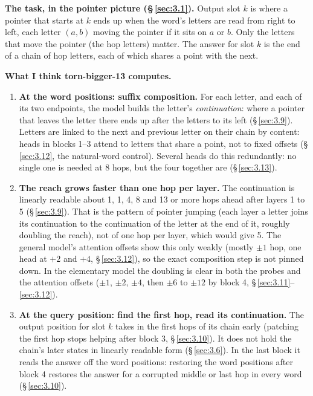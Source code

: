 \documentclass[paper=a4,fontsize=11pt,DIV=11,parskip=half,headings=small,numbers=noendperiod]{scrartcl}
\DeclareRobustCommand{\lead}[1]{\textsf{\bfseries\color{accent}#1}}
\DeclareRobustCommand{\code}[1]{{\fontseries{m}\ttfamily #1}}
\begin{document}
\lead{The task, in the pointer picture (\S\,\ref{sec:3.1}).} Output slot $k$ is where a pointer that starts at
$k$ ends up when the word’s letters are read from right to left, each letter $(a,b)$ moving the pointer if it
sits on $a$ or $b$. Only the letters that move the pointer (the hop letters) matter. The answer for slot $k$ is
the end of a chain of hop letters, each of which shares a point with the next.

\lead{What I think \code{torn-\allowbreak{}bigger-\allowbreak{}13} computes.}

\begin{enumerate}
\item \lead{At the word positions: suffix composition.} For each letter, and each of its two endpoints, the
  model builds the letter’s \emph{continuation}: where a pointer that leaves the letter there ends up after the
  letters to its left (\S\,\ref{sec:3.9}). Letters are linked to the next and previous letter on their chain by
  content: heads in blocks 1–3 attend to letters that share a point, not to fixed offsets (\S\,\ref{sec:3.12},
  the natural-word control). Several heads do this redundantly: no single one is needed at 8 hops, but the four
  together are (\S\,\ref{sec:3.13}).
\item \lead{The reach grows faster than one hop per layer.} The continuation is linearly readable about 1, 1, 4,
  8 and 13 or more hops ahead after layers 1 to 5 (\S\,\ref{sec:3.9}). That is the pattern of pointer jumping
  (each layer a letter joins its continuation to the continuation of the letter at the end of it, roughly
  doubling the reach), not of one hop per layer, which would give 5. The general model’s attention offsets show
  this only weakly (mostly $\pm1$ hop, one head at $+2$ and $+4$, \S\,\ref{sec:3.12}), so the exact composition
  step is not pinned down. In the elementary model the doubling is clear in both the probes and the attention
  offsets ($\pm1$, $\pm2$, $\pm4$, then $\pm6$ to $\pm12$ by block 4, \S\,\ref{sec:3.11}–\ref{sec:3.12}).
\item \lead{At the query position: find the first hop, read its continuation.} The output position for slot $k$
  takes in the first hops of its chain early (patching the first hop stops helping after block 3,
  \S\,\ref{sec:3.10}). It does not hold the chain’s later states in linearly readable form (\S\,\ref{sec:3.6}).
  In the last block it reads the answer off the word positions: restoring the word positions after block 4
  restores the answer for a corrupted middle or last hop in every word (\S\,\ref{sec:3.10}).

\end{enumerate}
\end{document}

